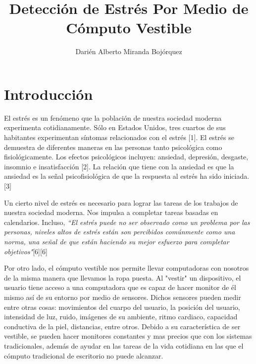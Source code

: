 \documentclass[letterpaper,12pt]{cicese}
\begin{document}
	\doublespace
	\title{Detecci\'on de Estr\'es Por Medio de C\'omputo Vestible}
	\author{Dari\'en Alberto Miranda Boj\'orquez}
	\maketitle
	\newpage
	\tableofcontents
	\newpage

		\chapter{Introducci\'on} 
			El estr\'es es un fen\'omeno que la poblaci\'on de nuestra sociedad moderna experimenta cotidianamente. S\'olo en Estados Unidos, tres cuartos de sus
			habitantes experimentan s\'intomas relacionados con el estr\'es [1]. El estr\'es se demuestra de diferentes maneras en las personas tanto psicol\'ogica
			como fisiol\'ogicamente. Los efectos psicol\'ogicos incluyen: ansiedad, depresi\'on, desgaste, insomnio e insatisfacci\'on [2]. La relaci\'on que tiene
			con la ansiedad es que la ansiedad es la se\~nal psicofisiol\'ogica de que la respuesta al estr\'es ha sido iniciada.[3]
			
			Un cierto  nivel de estr\'es es necesario para lograr las tareas de los trabajos de nuestra sociedad moderna. Nos impulsa a completar tareas basadas en 
			calendarios. Incluso, \emph{``El estr\'es puede no ser observado como un problema por las personas, niveles altos de estr\'es est\'an son percibidos com\'unmente 
			como una norma, una se\~nal de que est\'an  haciendo su mejor esfuerzo para completar objetivos"}[6][6]

			Por otro lado, el c\'omputo vestible nos permite llevar computadoras con nosotros de la misma manera que llevamos la ropa puesta. Al "vestir" un dispositivo,
			el usuario tiene acceso a una computadora que es capaz de hacer monitor de \'el mismo as\'i de su entorno por medio de sensores. Dichos sensores pueden medir entre
			otras cosas: movimientos del cuarpo del usuario, la posici\'on del usuario, intensidad de luz, ruido, im\'agenes de su ambiente, ritmo cardiaco, capacidad
			conductiva de la piel, distancias, entre otros. Debido a su caracter\'istica de ser vestible, se pueden hacer monitores constantes y mas precios que con
			los sistemas tradicionales, adem\'as de ayudar en las tareas de la vida cotidiana en las que el c\'omputo tradicional de escritorio no puede alcanzar.
			
\end{document}
